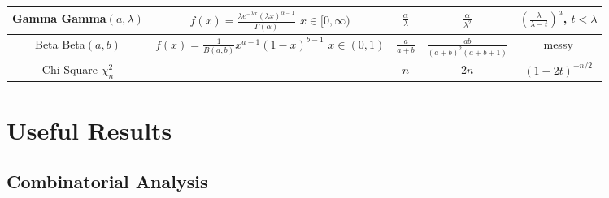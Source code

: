 \documentclass{article}
\begin{document}
\begin{center}
\begin{tabular}{c|c|c|c|c}
\hline
\makecell{Gamma \\ Gamma$(a,\lambda)$} & \makecell{$f(x) = \frac{\lambda e^{-\lambda x} (\lambda x)^{\alpha-1}}{\Gamma(\alpha)}$ \\ $x \in [0,\infty)$} & $\frac{\alpha}{\lambda}$ & $\frac{\alpha}{\lambda^2}$ & \makecell{$\left(\frac{\lambda}{\lambda-t}\right)^a$,\\ $t < \lambda$} \\
\hline
\makecell{Beta \\ Beta$(a,b)$} & \makecell{$f(x) = \frac{1}{B(a,b)}x^{a-1}(1-x)^{b-1}$ \\ $x \in (0,1)$} & $\frac{a}{a+b}$ &$\frac{ab}{(a+b)^2(a+b+1)}$ & messy\\
\hline
\makecell{Chi-Square \\ $\chi^2_n$} & &$n$ &$2n$ &$(1-2t)^{-n/2}$\\

\end{tabular}

\end{center}

\section{Useful Results}
\subsection{Combinatorial Analysis}
\end{document}
